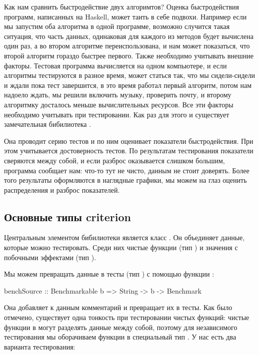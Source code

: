 Как нам сравнить быстродействие двух алгоримтов? Оценка быстродействия
программ, написанных на Haskell, может таить в себе подвохи.
Например если мы запустим оба алгоритма в одной программе,
возможно случится такая ситуация, что часть данных, одинаковая 
для каждого из методов будет вычислена один раз, а во втором
алгоритме переиспользована, и нам может показаться, что второй
алгоритм гораздо быстрее первого. Также необходимо учитывать
внешние факторы. Тестовая программа вычисляется на одном компьютере,
и если алгоритмы тестируются в разное время, может статься так,
что мы сидели-сидели и ждали пока тест завершится, в это
время работал первый алгоритм, потом нам надоело ждать, мы решили 
включить музыку, проверить почту, и второму алгоритмку 
досталось меньше вычислительных ресурсов.
Все эти факторы необходимо учитывать при тестировании.
Как раз для этого и существует замечательная бибилиотека 
.

Она проводит серию тестов и по ним оценивает показатели быстродействия.
При этом учитывается достоверность тестов. По результатам
тестирования показатели сверяются между собой, и если разброс
оказывается слишком большим, программа сообщает нам: что-то 
тут не чисто, данным не стоит доверять.
Более того результаты оформляются в наглядные графики, мы можем
на глаз оценить распределения и разброс показателей.

\subsection{Основные типы criterion}

Центральным элементом бибилиотеки является класс .
Он объединяет данные, которые можно тестировать. Среди них
чистые функции (тип ) и значения с побочными эффектами
(тип ). 

Мы можем превращать данные в тесты (тип ) 
с помощью функции :


\begin{code}
benchSource :: Benchmarkable b => String -> b -> Benchmark
\end{code}

Она добавляет к данным комментарий и превращает их в тесты.
Как было отмечено, существует одна тонкость при тестировании
чистых функций: чистые функции в  могут разделять
данные между собой, поэтому для независимого тестирования мы
оборачиваем функции в специальный тип . У нас есть
два варианта тестирования:

